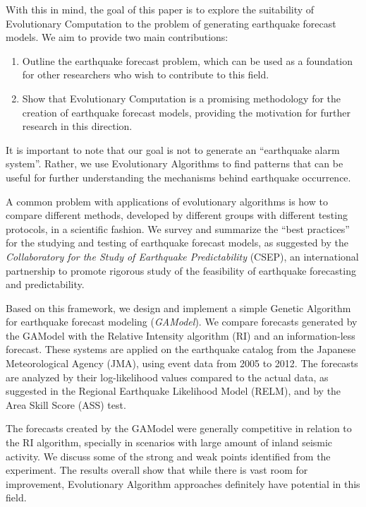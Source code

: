\documentclass[a4paper,twoside]{article}
\begin{document}
With this in mind, the goal of this paper is to explore the
suitability of Evolutionary Computation to the problem of generating
earthquake forecast models. We aim to provide two main contributions:
\begin{enumerate}
\item Outline the earthquake forecast problem, which can be used as a
  foundation for other researchers who wish to contribute to this
  field.
\item Show that Evolutionary Computation is a promising methodology
  for the creation of earthquake forecast models, providing the
  motivation for further research in this direction. 
\end{enumerate}

It is important to note that our goal is not to generate an
``earthquake alarm system''. Rather, we use Evolutionary Algorithms to
find patterns that can be useful for further understanding the
mechanisms behind earthquake occurrence.

A common problem with applications of evolutionary algorithms is how
to compare different methods, developed by different groups with
different testing protocols, in a scientific fashion. We survey and
summarize the ``best practices'' for the studying and testing of
earthquake forecast models, as suggested by the \emph{Collaboratory
  for the Study of Earthquake Predictability} (CSEP), an international
partnership to promote rigorous study of the feasibility of earthquake
forecasting and predictability.

Based on this framework, we design and implement a simple Genetic
Algorithm for earthquake forecast modeling (\emph{GAModel}). We
compare forecasts generated by the GAModel with the Relative Intensity
algorithm (RI) and an information-less forecast. These systems are
applied on the earthquake catalog from the Japanese Meteorological
Agency (JMA), using event data from 2005 to 2012. The forecasts are
analyzed by their log-likelihood values compared to the actual data,
as suggested in the Regional Earthquake Likelihood Model (RELM), and
by the Area Skill Score (ASS) test.

The forecasts created by the GAModel were generally competitive in
relation to the RI algorithm, specially in scenarios with large amount
of inland seismic activity. We discuss some of the strong and weak
points identified from the experiment. The results overall show that
while there is vast room for improvement, Evolutionary Algorithm
approaches definitely have potential in this field.
\end{document}

